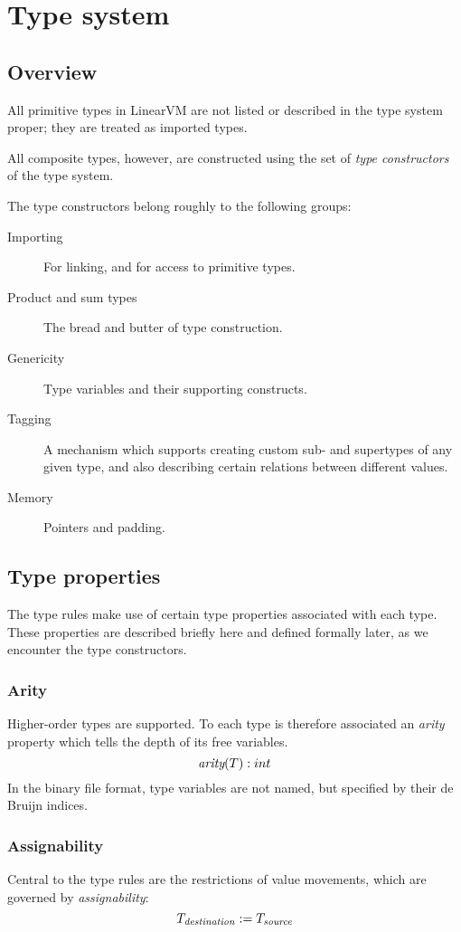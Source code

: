 \documentclass[a4paper]{report}
\newcommand\arity{{\ensuremath\textit{arity}}}
\begin{document}
\chapter{Type system}
\label{chap:typesystem}

\section{Overview}
All primitive types in LinearVM are not listed or described
in the type system proper; they are treated as imported types.

All composite types, however, are constructed using the set of
\emph{type constructors} of the type system.

The type constructors belong roughly to the following groups:
\begin{description}
\item[Importing] For linking, and for access to primitive types.
\item[Product and sum types] The bread and butter of type construction.
\item[Genericity] Type variables and their supporting constructs.
\item[Tagging] A mechanism which supports creating custom sub- and
  supertypes of any given type, and also describing certain relations
  between different values.
\item[Memory] Pointers and padding.
\end{description}


\section{Type properties}

The type rules make use of certain type properties associated with each type.
These properties are described briefly here and defined formally later,
as we encounter the type constructors.

\subsection{Arity}
Higher-order types are supported. To each type is therefore associated
an \emph{arity} property which tells the depth of its free variables.
$$
\arity(T) : int
$$
In the binary file format, type variables are not named, but specified
by their de Bruijn indices.

\subsection{Assignability}
Central to the type rules are the restrictions of value movements,
which are governed by \emph{assignability}:
$$
T_{\it destination} := T_{\it source}
$$
\end{document}
